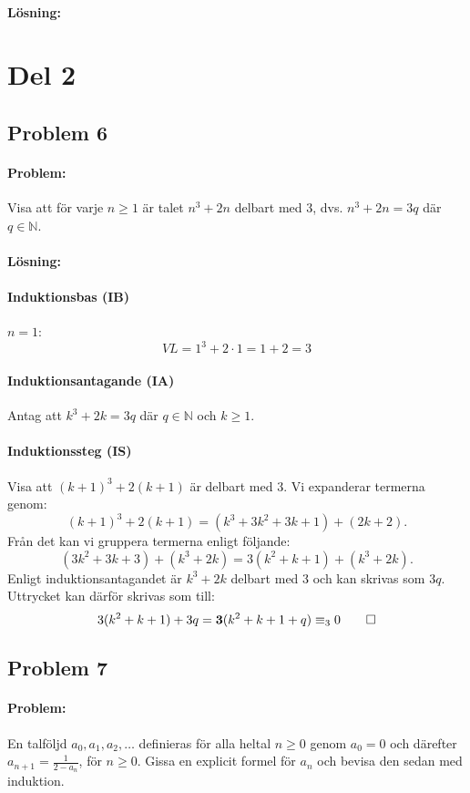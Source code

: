 \documentclass[12pt]{article}
\begin{document}
\paragraph{Lösning:}

\newpage 

\section*{Del 2}

\subsection*{Problem 6}
\paragraph{Problem:} Visa att för varje $n\ge 1$ är talet $n^3+2n$ delbart med 3, dvs. $n^3+2n = 3q$ där $q \in \mathbb{N}$.
\paragraph{Lösning:}
\paragraph{Induktionsbas (IB)} $n=1$:
\[VL = 1^3+2\cdot 1 = 1+2 = 3\]
\paragraph{Induktionsantagande (IA)} Antag att \(k^3+2k= 3q\) där \(q \in \mathbb{N}\) och $k \ge1$.
\paragraph{Induktionssteg (IS)} Visa att \((k+1)^3+2(k+1)\) är delbart med 3.\newline
Vi expanderar termerna genom:
\[(k+1)^3+2(k+1)=(k^3+3k^2+3k+1) + (2k+2).\]
Från det kan vi gruppera termerna enligt följande:
\[(3k^2+3k+3)+(k^3+2k) = 3(k^2+k+1) + (k^3+2k).\]
Enligt induktionsantagandet är $k^3+2k$ delbart med 3 och kan skrivas som $3q$. Uttrycket kan därför skrivas som till:
\[3(k^2+k+1) + 3q = \boldsymbol{3}(k^2+k+1+q) \equiv_3 0 \qed\]


\newpage\noindent\subsection*{Problem 7}
\paragraph{Problem:} En talföljd $a_0, a_1, a_2, \dotsc$ definieras för alla heltal $n\ge 0$ genom $a_0=0$ och därefter \(a_{n+1}=\frac 1{2-a_n}\), för $n\ge 0$. Gissa en explicit formel för $a_n$ och bevisa den sedan med induktion.
\end{document}
